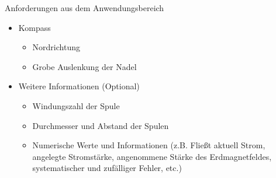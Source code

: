 \begin{frame}[fragile]{Anforderungen aus dem Anwendungsbereich}
\begin{itemize}
\setlength{\itemsep}{-0.25em}
\item Kompass
\begin{itemize}
\setlength{\itemsep}{-0.25em}
\item Nordrichtung
\item Grobe Auslenkung der Nadel
\end{itemize}
\item Weitere Informationen (Optional)
\begin{itemize}
\item Windungszahl der Spule
\item Durchmesser und Abstand der Spulen
\item Numerische Werte und Informationen (z.B. Fließt aktuell Strom, angelegte Stromstärke, angenommene Stärke des Erdmagnetfeldes, systematischer und zufälliger Fehler, etc.)
\end{itemize}
\end{itemize}
\end{frame}

